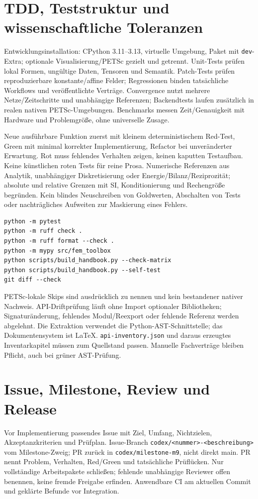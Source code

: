\section{TDD, Teststruktur und wissenschaftliche Toleranzen}
Entwicklungsinstallation: CPython 3.11--3.13, virtuelle Umgebung, Paket mit
\texttt{dev}-Extra; optionale Visualisierung/PETSc gezielt und getrennt.
Unit-Tests prüfen lokal Formen, ungültige Daten, Tensoren und Semantik.
Patch-Tests prüfen reproduzierbare konstante/affine Felder; Regressionen
binden tatsächliche Workflows und veröffentlichte Verträge. Convergence
nutzt mehrere Netze/Zeitschritte und unabhängige Referenzen; Backendtests
laufen zusätzlich in realen nativen PETSc-Umgebungen. Benchmarks messen
Zeit/Genauigkeit mit Hardware und Problemgröße, ohne universelle Zusage.

Neue ausführbare Funktion zuerst mit kleinem deterministischem Red-Test,
Green mit minimal korrekter Implementierung, Refactor bei unveränderter
Erwartung. Rot muss fehlendes Verhalten zeigen, keinen kaputten Testaufbau.
Keine künstlichen roten Tests für reine Prosa. Numerische Referenzen aus
Analytik, unabhängiger Diskretisierung oder Energie/Bilanz/Reziprozität;
absolute und relative Grenzen mit SI, Konditionierung und Rechengröße
begründen. Kein blindes Neuschreiben von Goldwerten, Abschalten von Tests
oder nachträgliches Aufweiten zur Maskierung eines Fehlers.
\begin{lstlisting}
python -m pytest
python -m ruff check .
python -m ruff format --check .
python -m mypy src/fem_toolbox
python scripts/build_handbook.py --check-matrix
python scripts/build_handbook.py --self-test
git diff --check
\end{lstlisting}
PETSc-lokale Skips sind ausdrücklich zu nennen und kein bestandener nativer
Nachweis. API-Driftprüfung läuft ohne Import optionaler Bibliotheken;
Signaturänderung, fehlendes Modul/Reexport oder fehlende Referenz werden abgelehnt.
Die Extraktion verwendet die Python-AST-Schnittstelle\cite{python-ast};
das Dokumentensystem ist LaTeX\cite{latex-project}.
\texttt{api-inventory.json} und daraus erzeugtes Inventarkapitel müssen zum
Quellstand passen. Manuelle Fachverträge bleiben Pflicht, auch bei grüner AST-Prüfung.

\section{Issue, Milestone, Review und Release}
Vor Implementierung passendes Issue mit Ziel, Umfang, Nichtzielen,
Akzeptanzkriterien und Prüfplan. Issue-Branch
\texttt{codex/<nummer>-<beschreibung>} vom Milestone-Zweig; PR zurück in
\texttt{codex/milestone-m9}, nicht direkt main. PR nennt Problem, Verhalten,
Red/Green und tatsächliche Prüflücken. Nur vollständige Arbeitspakete schließen;
fehlende unabhängige Reviewer offen benennen, keine fremde Freigabe erfinden.
Anwendbare CI am aktuellen Commit und geklärte Befunde vor Integration.

